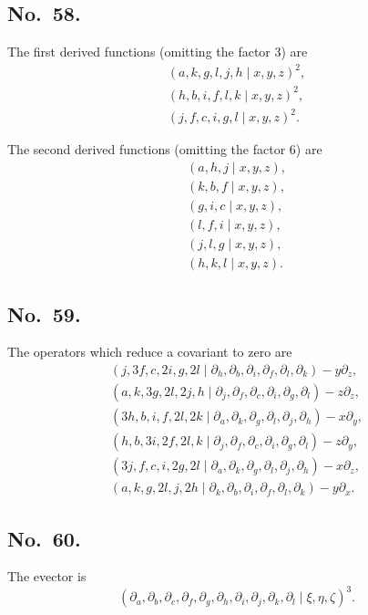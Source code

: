 \documentclass[11pt]{article}
\begin{document}
\subsection*{No.\ 58.}
The first derived functions (omitting the factor 3) are
\begin{align*}
(a, k, g, l, j, h \mid x, y, z)^2, \\
(h, b, i, f, l, k \mid x, y, z)^2, \\
(j, f, c, i, g, l \mid x, y, z)^2.
\end{align*}

The second derived functions (omitting the factor 6) are
\begin{align*}
(a, h, j \mid x, y, z), \\
(k, b, f \mid x, y, z), \\
(g, i, c \mid x, y, z), \\
(l, f, i \mid x, y, z), \\
(j, l, g \mid x, y, z), \\
(h, k, l \mid x, y, z).
\end{align*}

\subsection*{No.\ 59.}
The operators which reduce a covariant to zero are
\begin{align*}
(j, 3f, c, 2i, g, 2l \mid \partial_h, \partial_b, \partial_i, \partial_f, \partial_l, \partial_k) - y\partial_z, \\
(a, k, 3g, 2l, 2j, h \mid \partial_j, \partial_f, \partial_c, \partial_i, \partial_g, \partial_l) - z\partial_z, \\
(3h, b, i, f, 2l, 2k \mid \partial_a, \partial_k, \partial_g, \partial_l, \partial_j, \partial_h) - x\partial_y, \\
(h, b, 3i, 2f, 2l, k \mid \partial_j, \partial_f, \partial_c, \partial_i, \partial_g, \partial_l) - z\partial_y, \\
(3j, f, c, i, 2g, 2l \mid \partial_a, \partial_k, \partial_g, \partial_l, \partial_j, \partial_h) - x\partial_z, \\
(a, k, g, 2l, j, 2h \mid \partial_k, \partial_b, \partial_i, \partial_f, \partial_l, \partial_k) - y\partial_x.
\end{align*}

\subsection*{No.\ 60.}
The evector is
\[
(\partial_a, \partial_b, \partial_c, \partial_f, \partial_g, \partial_h, \partial_i, \partial_j, \partial_k, \partial_l \mid \xi, \eta, \zeta)^3.
\]
\end{document}
